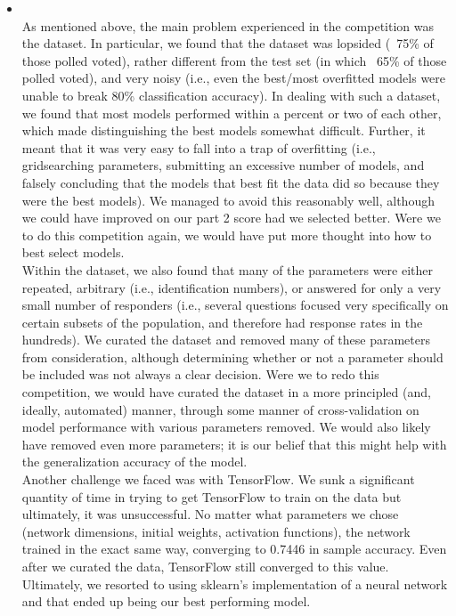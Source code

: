 \begin{itemize}
    \item {} \\
    As mentioned above, the main problem experienced in the competition was the dataset. In particular, we found that the dataset was lopsided (~75\% of those polled voted), rather different from the test set (in which ~65\% of those polled voted), and very noisy (i.e., even the best/most overfitted models were unable to break 80\% classification accuracy). In dealing with such a dataset, we found that most models performed within a percent or two of each other, which made distinguishing the best models somewhat difficult. Further, it meant that it was very easy to fall into a trap of overfitting (i.e., gridsearching parameters, submitting an excessive number of models, and falsely concluding that the models that best fit the data did so because they were the best models). We managed to avoid this reasonably well, although we could have improved on our part 2 score had we selected better. Were we to do this competition again, we would have put more thought into how to best select models. \\

    Within the dataset, we also found that many of the parameters were either repeated, arbitrary (i.e., identification numbers), or answered for only a very small number of responders (i.e., several questions focused very specifically on certain subsets of the population, and therefore had response rates in the hundreds). We curated the dataset and removed many of these parameters from consideration, although determining whether or not a parameter should be included was not always a clear decision. Were we to redo this competition, we would have curated the dataset in a more principled (and, ideally, automated) manner, through some manner of cross-validation on model performance with various parameters removed. We would also likely have removed even more parameters; it is our belief that this might help with the generalization accuracy of the model. \\

    Another challenge we faced was with TensorFlow. We sunk a significant quantity of time in trying to get TensorFlow to train on the data but ultimately, it was unsuccessful. No matter what parameters we chose (network dimensions, initial weights, activation functions), the network trained in the exact same way, converging to 0.7446 in sample accuracy. Even after we curated the data, TensorFlow still converged to this value. Ultimately, we resorted to using sklearn's implementation of a neural network and that ended up being our best performing model. \\


\end{itemize}
